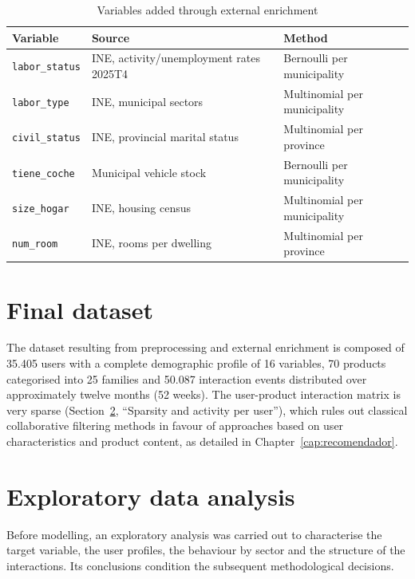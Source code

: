\begin{table}[htbp]
\centering
\caption{Variables added through external enrichment}
\label{tab:variables_enriquecidas}
\begin{tabular}{lll}
\toprule
\textbf{Variable} & \textbf{Source} & \textbf{Method} \\
\midrule
\texttt{labor\_status}   & INE, activity/unemployment rates 2025T4   & Bernoulli per municipality \\
\texttt{labor\_type}     & INE, municipal sectors          & Multinomial per municipality \\
\texttt{civil\_status}   & INE, provincial marital status       & Multinomial per province \\
\texttt{tiene\_coche}    & Municipal vehicle stock      & Bernoulli per municipality \\
\texttt{size\_hogar}     & INE, housing census            & Multinomial per municipality \\
\texttt{num\_room}       & INE, rooms per dwelling     & Multinomial per province \\
\bottomrule
\end{tabular}
\end{table}

\section{Final dataset}

The dataset resulting from preprocessing and external enrichment is composed of 35.405 users with a complete demographic profile of 16 variables, 70 products categorised into 25 families and 50.087 interaction events distributed over approximately twelve months (52 weeks). The user-product interaction matrix is very sparse (Section~\ref{sec:eda}, ``Sparsity and activity per user''), which rules out classical collaborative filtering methods in favour of approaches based on user characteristics and product content, as detailed in Chapter~\ref{cap:recomendador}.

\section{Exploratory data analysis}
\label{sec:eda}

Before modelling, an exploratory analysis was carried out to characterise the target variable, the user profiles, the behaviour by sector and the structure of the interactions. Its conclusions condition the subsequent methodological decisions.

